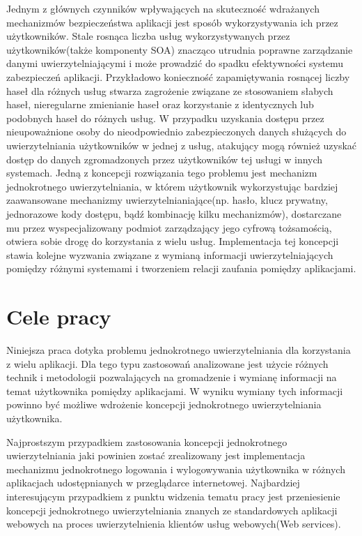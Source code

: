 Jednym z głównych czynników wpływających na skuteczność wdrażanych mechanizmów bezpieczeństwa aplikacji jest sposób wykorzystywania ich przez użytkowników. Stale rosnąca liczba usług wykorzystywanych przez użytkowników(także komponenty SOA) znacząco utrudnia poprawne zarządzanie danymi uwierzytelniającymi i może prowadzić do spadku efektywności systemu zabezpieczeń aplikacji. Przykładowo konieczność zapamiętywania rosnącej liczby haseł dla różnych usług stwarza zagrożenie związane ze stosowaniem słabych haseł, nieregularne zmienianie haseł oraz korzystanie z identycznych lub podobnych haseł do różnych usług. W przypadku uzyskania dostępu przez nieupoważnione osoby do nieodpowiednio zabezpieczonych danych służących do uwierzytelniania użytkowników w jednej z usług, atakujący mogą również uzyskać dostęp do danych zgromadzonych przez użytkowników tej usługi w innych systemach. Jedną z koncepcji rozwiązania tego problemu jest mechanizm jednokrotnego uwierzytelniania, w którem użytkownik wykorzystując bardziej zaawansowane mechanizmy uwierzytelnianiające(np. hasło, klucz prywatny, jednorazowe kody dostępu, bądź kombinację kilku mechanizmów), dostarczane mu przez wyspecjalizowany podmiot zarządzający jego cyfrową tożsamością, otwiera sobie drogę do korzystania z wielu usług. Implementacja tej koncepcji stawia kolejne wyzwania związane z wymianą informacji uwierzytelniających pomiędzy różnymi systemami i tworzeniem relacji zaufania pomiędzy aplikacjami.


\section{Cele pracy}
\label{sec:celePracy}

	Niniejsza praca dotyka problemu jednokrotnego uwierzytelniania dla korzystania z wielu aplikacji. Dla tego typu zastosowań analizowane jest użycie różnych technik i metodologii pozwalających na gromadzenie i wymianę informacji na temat użytkownika pomiędzy aplikacjami. W wyniku wymiany tych informacji powinno być możliwe wdrożenie koncepcji jednokrotnego uwierzytelniania użytkownika.

	Najprostszym przypadkiem zastosowania koncepcji jednokrotnego uwierzytelniania jaki powinien zostać zrealizowany jest implementacja mechanizmu jednokrotnego logowania i wylogowywania użytkownika w różnych aplikacjach udostępnianych w przeglądarce internetowej. Najbardziej interesującym przypadkiem z punktu widzenia tematu pracy jest przeniesienie koncepcji jednokrotnego uwierzytelniania znanych ze standardowych aplikacji webowych na proces uwierzytelnienia klientów usług webowych(Web services).

